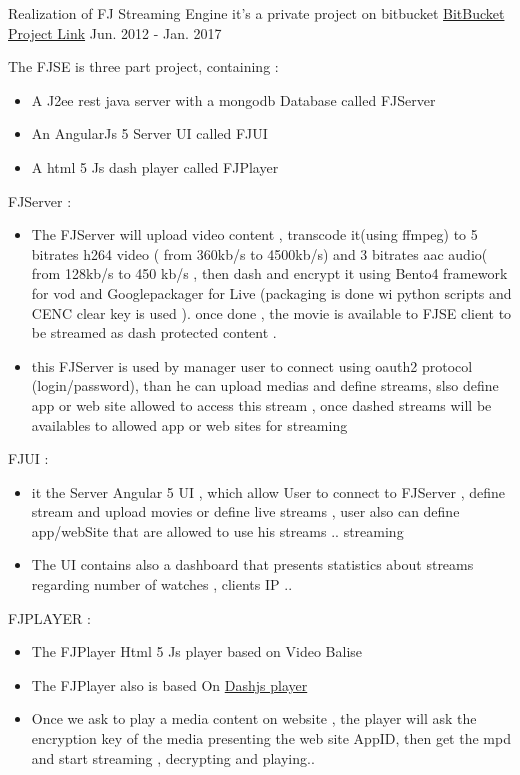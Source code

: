 \begin{cventries}

\cventry
{Realization of FJ Streaming Engine} %
{it's a private project on bitbucket } %
{ \href{https://bitbucket.org/account/user/easysoftin/projects/FJSE}{BitBucket Project Link} }%
{Jun. 2012 - Jan. 2017}  %
{ %
\begin{cvitems}
\item {The FJSE is three part project, containing :}
\begin{itemize}
\item { A J2ee rest java server  with a mongodb Database called FJServer}
\item { An AngularJs 5 Server UI called FJUI }
\item { A  html 5 Js dash player called FJPlayer}
\end{itemize}
\item {  FJServer : }
\begin{itemize}
\item{ The FJServer will upload video content ,  transcode it(using ffmpeg) to 5 bitrates h264 video ( from 360kb/s to 4500kb/s) and 3 bitrates aac audio( from 128kb/s to 450 kb/s , then dash and encrypt it using Bento4 framework for vod and Googlepackager for Live (packaging is done wi python scripts and CENC clear key  is used ). once done , the movie is available to FJSE client to be streamed as dash protected content . }
\item {this FJServer is used by manager user to connect using oauth2 protocol (login/password), than he can upload medias and define streams, slso define app or web site allowed to access this stream , once dashed streams will be availables to allowed app or web sites for streaming}
\end{itemize}
\item {FJUI :}
\begin{itemize}
\item {it the Server Angular 5 UI , which allow User  to connect to FJServer , define stream and upload movies or define live streams  , user also can define app/webSite that are allowed to use his streams ..
 streaming}
\item {The UI contains also a dashboard that presents statistics about streams regarding number of watches , clients IP ..}
\end{itemize}
\item { FJPLAYER :}
\begin{itemize}
\item {The FJPlayer Html 5 Js player based on Video Balise }
\item {The FJPlayer also is based On \href{http://dashif.org/reference/players/javascript/1.4.0/samples/dash-if-reference-player/}{Dashjs player} }
\item {Once we ask to play a media content on website , the player will ask the encryption key of the media presenting the web site AppID, then get the mpd and start streaming , decrypting  and playing..}
\end{itemize}
\end{cvitems}
}


\end{cventries}
